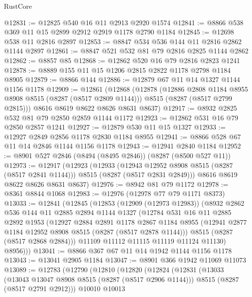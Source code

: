 \begin{lexlean}{RustCore}
\begin{coremodule}
@12831 := @12825 @540 @16 @11 @2913 @2920 @1574
@12841 := @8866 @538 @369 @11 @15 @2899 @2912 @2919 @1178 @2790 @1184
@12845 := @12698 @538 @11 @2816 @2897
@12853 := @8847 @534 @536 @144 @11 @2816 @2862 @1144 @2897
@12861 := @8847 @521 @532 @81 @79 @2816 @2825 @1144 @2862
@12862 := @8857 @85
@12868 := @12862 @520 @16 @79 @2816 @2823 @1241
@12878 := @8889 @155 @11 @15 @1206 @2815 @2822 @1178 @2798 @1184 @8905
@12879 := @8866 @144
@12886 := @12879 @67 @11 @14 @1327 @1144 @1156 @1178
@12909 := @12861
    (@12868
      (@12878
        (@12886 @2808 @1184 @8955 @8908 @8515 (@8287 (@8517 @2809 @1144)))
        @8515
        (@8287 (@8517 @2799 @2815)))
      @8616
      @8619
      @8622
      @8626
      @8631
      @8637)
@12917 := @8932 @2825 @532 @81 @79 @2850 @2859 @1144 @1172
@12923 := @12862 @531 @16 @79 @2850 @2857 @1241
@12927 := @12879 @530 @11 @15 @1327
@12933 := @12927 @2849 @2856 @1178 @2830 @1184 @8955
@12941 := @8866 @528 @67 @11 @14 @2846 @1144 @1156 @1178
@12943 := @12941 @2840 @1184
@12952 := @8901 @527 @2846 (@8494 (@8495 @2846)) (@8287 (@8500 @527 @11))
@12973 := @12917
    (@12923
      (@12933
        (@12943 @12952 @8908 @8515 (@8287 (@8517 @2841 @1144)))
        @8515
        (@8287 (@8517 @2831 @2849)))
      @8616
      @8619
      @8622
      @8626
      @8631
      @8637)
@12976 := @8942 @81 @79 @1172
@12978 := @8361 @8844 @1068
@12983 := @12976 (@12978 @77 @79 @1171 @8373)
@13033 := @12841
    (@12845
      (@12853
        (@12909 (@12973 @12983))
        (@8932
          @2862
          @536
          @144
          @11
          @2885
          @2894
          @1144
          @1327
          (@12784
            @531
            @16
            @11
            @2885
            @2892
            @1953
            (@12927
              @2884
              @2891
              @1178
              @2867
              @1184
              @8955
              (@12941 @2877 @1184 @12952 @8908 @8515 (@8287 (@8517 @2878 @1144)))
              @8515
              (@8287 (@8517 @2868 @2884)))
            @11109
            @11112
            @11115
            @11119
            @11124
            @11130)
          @8956)))
@13041 := @8866 @367 @67 @11 @14 @1942 @1144 @1156 @1178
@13043 := @13041 @2905 @1184
@13047 := @8901 @366 @1942 @11069 @11073
@13089 := @12783
    (@12790
      (@12810
        (@12820
          (@12824
            (@12831
              (@13033
                (@13043 @13047 @8908 @8515 (@8287 (@8517 @2906 @1144)))
                @8515
                (@8287 (@8517 @2791 @2912)))
              @10010
              @10013

\end{coremodule}
\end{lexlean}
